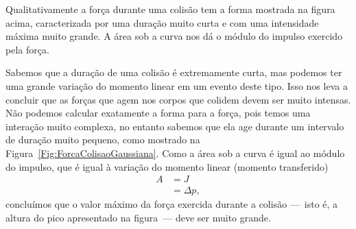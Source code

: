 \begin{marginfigure}
\centering
{}
\caption{Qualitativamente a força durante uma colisão tem a forma mostrada na figura acima, caracterizada por uma duração muito curta e com uma intensidade máxima muito grande. A área sob a curva nos dá o módulo do impulso exercido pela força.\label{Fig:ForcaColisaoGaussiana}}
\end{marginfigure}

Sabemos que a duração de uma colisão é extremamente curta, mas podemos ter uma grande variação do momento linear em um evento deste tipo. Isso nos leva a concluir que as forças que agem nos corpos que colidem devem ser muito intensas. Não podemos calcular exatamente a forma para a força, pois temos uma interação muito complexa, no entanto sabemos que ela age durante um intervalo de duração muito pequeno, como mostrado na Figura~\ref{Fig:ForcaColisaoGaussiana}. Como a área sob a curva é igual ao módulo do impulso, que é igual à variação do momento linear (momento transferido)
\begin{align}
    A &= J \\
    &= \Delta p,
\end{align}
%
concluímos que o valor máximo da força exercida durante a colisão ---~isto é, a altura do pico apresentado na figura~--- deve ser muito grande.

